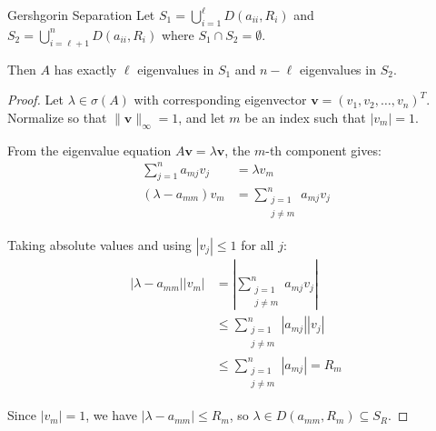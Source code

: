 \begin{theorem}{Gershgorin Separation}{}
    Let $S_1 = \bigcup_{i=1}^\ell D(a_{ii}, R_i)$ and $S_2 = \bigcup_{i=\ell+1}^n D(a_{ii}, R_i)$ where $S_1 \cap S_2 = \emptyset$.

    Then $A$ has exactly $\ell$ eigenvalues in $S_1$ and $n-\ell$ eigenvalues in $S_2$.
\end{theorem}
\begin{proof}
    Let $\lambda \in \sigma(A)$ with corresponding eigenvector $\mathbf{v} = (v_1, v_2, \ldots, v_n)^T$.
    Normalize so that $\|\mathbf{v}\|_\infty = 1$, and let $m$ be an index such that $|v_m| = 1$.

    From the eigenvalue equation $A\mathbf{v} = \lambda\mathbf{v}$, the $m$-th component gives:
    \begin{align}
        \sum_{j=1}^n a_{mj} v_j & = \lambda v_m         \\
        (\lambda - a_{mm}) v_m  & = \sum_{\substack{j=1 \\ j \neq m}}^n a_{mj} v_j
    \end{align}

    Taking absolute values and using $|v_j| \leq 1$ for all $j$:
    \begin{align}
        |\lambda - a_{mm}||v_m| & = \left|\sum_{\substack{j=1 \\ j \neq m}}^n a_{mj} v_j\right| \\
                                & \leq \sum_{\substack{j=1    \\ j \neq m}}^n |a_{mj}||v_j| \\
                                & \leq \sum_{\substack{j=1    \\ j \neq m}}^n |a_{mj}| = R_m
    \end{align}

    Since $|v_m| = 1$, we have $|\lambda - a_{mm}| \leq R_m$, so $\lambda \in D(a_{mm}, R_m) \subseteq S_R$.
\end{proof}

